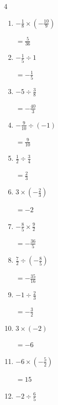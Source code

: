 \begin{multicols}{4}
\begin{enumerate}
        $\displaystyle =-\frac{8}{3}$

  \item $\displaystyle -\frac{1}{8}\times{}\left(-\frac{10}{9}\right)$

        $\displaystyle =\frac{5}{36}$

  \item $\displaystyle -\frac{1}{5}\div{}1$

        $\displaystyle =-\frac{1}{5}$

  \item $\displaystyle -5\div{}\frac{3}{8}$

        $\displaystyle =-\frac{40}{3}$

  \item $\displaystyle -\frac{9}{10}\div{}\left(-1\right)$

        $\displaystyle =\frac{9}{10}$

  \item $\displaystyle \frac{1}{2}\div{}\frac{3}{4}$

        $\displaystyle =\frac{2}{3}$

  \item $\displaystyle 3\times{}\left(-\frac{2}{3}\right)$

        $\displaystyle =-2$

  \item $\displaystyle -\frac{8}{5}\times{}\frac{9}{2}$

        $\displaystyle =-\frac{36}{5}$

  \item $\displaystyle \frac{7}{2}\div{}\left(-\frac{8}{5}\right)$

        $\displaystyle =-\frac{35}{16}$

  \item $\displaystyle -1\div{}\frac{2}{3}$

        $\displaystyle =-\frac{3}{2}$

\columnbreak %

\resetques

  \item $\displaystyle 3\times{}\left(-2\right)$

        $\displaystyle =-6$

  \item $\displaystyle -6\times{}\left(-\frac{5}{2}\right)$

        $\displaystyle =15$

  \item $\displaystyle -2\div{}\frac{6}{5}$


\end{enumerate}
\end{multicols}
